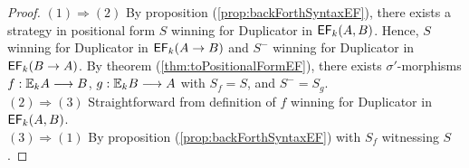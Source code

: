 \begin{prop}
\begin{cor}
\begin{proof}
$(1) \Rightarrow (2)$ By proposition (\ref{prop:backForthSyntaxEF}), there exists a strategy in positional form $S$ winning for Duplicator in ${\mathsf{EF}_{k}(A,B)}$. Hence, $S$ winning for Duplicator in ${\mathsf{EF}_{k}(A \rightarrow B)}$ and $S^{-}$ winning for Duplicator in ${\mathsf{EF}_{k}(B \rightarrow A)}$. By theorem (\ref{thm:toPositionalFormEF}), there exists $\sigma'$-morphisms $f:{\mathbb{E}_{k}A} \longrightarrow B$, $g:{\mathbb{E}_{k}B} \longrightarrow A$ with $S_{f} = S$, and $S^{-} = S_{g}$. \\ 
$(2) \Rightarrow (3)$ Straightforward from definition of $f$ winning for Duplicator in ${\mathsf{EF}_{k}(A,B)}$. \\ 
$(3) \Rightarrow (1)$ By proposition (\ref{prop:backForthSyntaxEF}) with $S_{f}$ witnessing $S$.  
\end{proof}
\label{cor:backForthEF}
\end{cor}
\label{prop:backForthSyntaxEF}
\end{prop}
